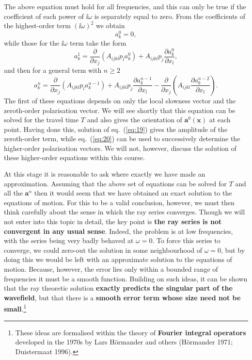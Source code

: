 The above equation must hold for all frequencies, and this can only be true if the coefficient of each power of $\ii\omega$ is separately equal to zero. From the coefficients of the highest-order term $(\ii\omega)^{2}$ we obtain
\begin{equation}
[A_{ijkl}p_{j}p_{l}-\rho\delta_{ik}]a_{k}^{0}=0,
\label{eq:18}
\end{equation}
while those for the $\ii\omega$ term take the form
\begin{equation}
[A_{ijkl}p_{j}p_{l}-\rho\delta_{ik}]a_{k}^{1}=\frac{\partial}{\partial x_{j}}(A_{ijkl}p_{l}a_{k}^{0})+A_{ijkl}p_{j}\frac{\partial a_{k}^{0}}{\partial x_{l}},
\label{eq:19}
\end{equation}
and then for a general term with $n\ge2$
\begin{equation}
[A_{ijkl}p_{j}p_{l}-\rho\delta_{ik}]a_{k}^{n}=\frac{\partial}{\partial x_{j}}(A_{ijkl}p_{l}a_{k}^{n-1})+A_{ijkl}p_{j}\frac{\partial a_{k}^{n-1}}{\partial x_{l}}-\frac{\partial}{\partial x_{j}}\left(A_{ijkl}\frac{\partial a_{k}^{n-2}}{\partial x_{l}}\right).
\label{eq:20}
\end{equation}
The first of these equations depends on only the local slowness vector and the zeroth-order polarisation vector. We will see shortly that 
this equation can be solved for the travel time $T$ and also gives the orientation of $\mathbf{a}^{0}(\mathbf{x})$ at each point. 
Having done this, solution of eq.~(\ref{eq:19}) gives the amplitude of the zeroth-order term, while eq.~(\ref{eq:20}) can be used to successively 
determine the higher-order polarisation vectors. We will not, however, discuss the solution of these higher-order equations
 within this course.

At this stage it is reasonable to ask where exactly we have made an approximation. Assuming that the above set of equations 
can be solved for $T$ and all the $\mathbf{a}^{n}$ then it would seem that we have obtained an exact solution to the equations of motion. 
For this to be a valid conclusion, however, we must then think carefully about the sense in which the ray series converges. 
Though we will not enter into this topic in detail, the key point is \textbf{the ray series is not convergent in any usual sense}. 
Indeed, the problem is at low frequencies, with the series being very badly behaved at $\omega=0$. To force this series to converge, 
we could zero-out the solution in some neighbourhood of $\omega=0$, but by doing this we would be left with an approximate 
solution to the equations of motion. Because, however, the error lies only within a bounded range of frequencies it must be a smooth 
function. Building on such ideas, it can be shown that the ray theoretic solution \textbf{exactly predicts the 
 singular part of the wavefield}, but that there is a \textbf{smooth error term whose size need not be small}.\footnote{These ideas are
formalised within the theory of \textbf{Fourier integral operators} developed in the 1970s by Lars H\"{o}rmander and others (H\"{o}rmander 1971; Duistermaat 1996).}

